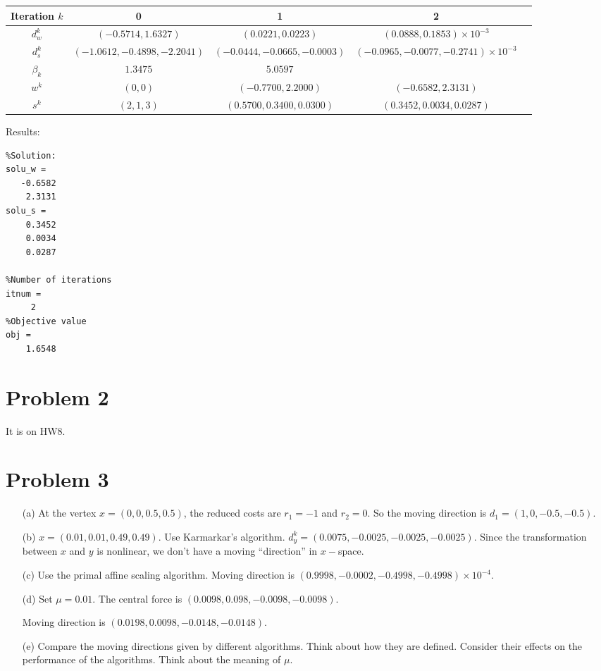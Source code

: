 \documentclass[12pt]{article}
\begin{document}
\begin{enumerate}
\begin{table}[h]
\footnotesize
    \begin{tabular}{|c|c|c|c|c|}
      \hline
      Iteration $k$ & 0 & 1  & 2 \\
      \hline
      $d_w^k$ & $( -0.5714, 1.6327)$ & $(0.0221, 0.0223)$ & $(0.0888, 0.1853)\times 10^{-3}$  \\
      \hline
      $d_s^k$ & $(-1.0612, -0.4898, -2.2041)$ & $(-0.0444, -0.0665, -0.0003)$ & $(-0.0965, -0.0077, -0.2741)\times10^{-3}$  \\
      \hline
      $\beta_k$ & $1.3475$ & $5.0597$ &   \\
      \hline
      $w^k$ & $(0,0)$ & $(-0.7700, 2.2000)$ & $(-0.6582, 2.3131)$\\
      \hline
      $s^k$ & $(2,1,3)$ & $( 0.5700, 0.3400, 0.0300)$ & $ (0.3452, 0.0034, 0.0287)$ \\
      \hline
    \end{tabular}
\end{table}

Results:

\begin{lstlisting}
%Solution:
solu_w =
   -0.6582
    2.3131
solu_s =
    0.3452
    0.0034
    0.0287

%Number of iterations
itnum =
     2
%Objective value
obj =
    1.6548    
\end{lstlisting}

\end{enumerate}

\section*{Problem 2}
It is on HW8.

\section*{Problem 3}

\begin{itemize}
  \item[(a)] At the vertex $x=(0,0,0.5,0.5)$, the reduced costs are $r_1=-1$ and $r_2=0$. So the moving direction is $d_1=(1,0,-0.5,-0.5)$.
  \item[(b)] $x=(0.01,0.01,0.49,0.49)$. Use Karmarkar's algorithm. $d^k_y=(0.0075,-0.0025,-0.0025,-0.0025)$. Since the transformation between $x$ and $y$ is nonlinear, we don't have a moving ``direction'' in $x-$space.
  \item[(c)] Use the primal affine scaling algorithm. Moving direction is $(0.9998,-0.0002,-0.4998,-0.4998)\times 10^{-4}$.
  \item[(d)] Set $\mu=0.01$. The central force is $(0.0098,0.098,-0.0098,-0.0098)$.

  Moving direction is $(0.0198,0.0098,-0.0148,-0.0148)$.
  \item[(e)] Compare the moving directions given by different algorithms. Think about how they are defined. Consider their effects on the performance of the algorithms. Think about the meaning of $\mu$.
\end{itemize}
\end{document}
